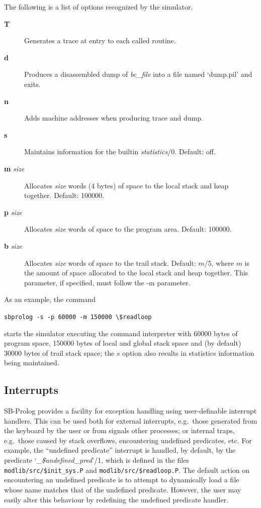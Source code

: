 The following is a list of options recognized by the simulator.
\begin{description}
\item[{\bf T}] Generates a trace at entry to each called routine.
\item[{\bf d}] Produces a disassembled dump of {\em bc\_file} into a file named
    `dump.pil' and exits.
\item[{\bf n}] Adds machine addresses when producing trace and dump.
\item[{\bf s}] Maintains information for the builtin {\em statistics}/0.
    Default: off.
\item[{\bf m} {\em size}] Allocates {\em size} words (4 bytes)
    of space to the local stack and heap together.
    Default: 100000.
\item[{\bf p} {\em size}] Allocates {\em size} words of space
    to the program area.  Default: 100000.
\item[{\bf b} {\em size}] Allocates {\em size} words of space
    to the trail stack.
    Default: $m$/5, where $m$ is the amount of space allocated to the
    local stack and heap together.
    This parameter, if specified, must follow the -m parameter.
\end{description}

As an example, the command
\begin{center}
{\verb|sbprolog -s -p 60000 -m 150000 \$readloop|}
\end{center}
starts the simulator executing the command interpreter with 60000 bytes of
program space, 150000 bytes of local and global stack space and (by default)
30000 bytes of trail stack space; the $s$ option also results in
statistics information being maintained.

\subsection{Interrupts}

SB-Prolog provides a facility for exception
handling using user-definable interrupt handlers.
This can be used both for external interrupts,
e.g.\ those generated from the keyboard by the user or from signals
other processes; or internal traps, e.g.\ those caused by stack overflows,
encountering undefined predicates, etc.
For example, the ``undefined predicate'' interrupt is handled, by default,
by the predicate `{\em \_\$undefined\_pred}'/1, which is defined in the files
{\tt modlib/src/\$init\_sys.P} and {\tt modlib/src/\$readloop.P}.
The default action on encountering an undefined predicate is to attempt to
dynamically load a file whose name matches that of the undefined predicate.
However, the user may easily alter this behaviour by
redefining the undefined predicate handler.

